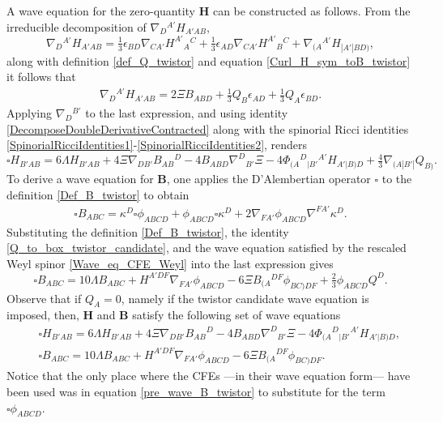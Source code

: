 \documentclass[10pt,a4paper]{article}
\theoremstyle{plain}
\def\bmB{{\bm B}}
\def\bmH{{\bm H}}
\begin{document}
A wave equation for the zero-quantity $\bmH$ can be constructed as
follows.  From the irreducible decomposition of
$\nabla_D{}^{A'}H_{A'AB}$,
\[
\nabla_{D}{}^{A'}H_{A'AB} = \tfrac{1}{3} \epsilon _{BD}
\nabla_{CA'}H^{A'}{}_{A}{}^{C} + \tfrac{1}{3} \epsilon _{AD}
\nabla_{CA'}H^{A'}{}_{B}{}^{C} + \nabla_{(A}{}^{A'}H_{|A'|BD)},
\]
 along with definition \eqref{def_Q_twistor} and equation
\eqref{Curl_H_sym_toB_twistor} it follows that
\begin{align}\label{derH_twistor_toBandQ}
\nabla_{D}{}^{A'}H_{A'AB} = 2 \Xi B_{ABD}  + \tfrac{1}{3} Q_{B}
\epsilon _{AD} + \tfrac{1}{3} Q_{A} \epsilon _{BD}.
\end{align}
Applying $\nabla_{D}{}^{B'}$ to the last expression, and using
identity \eqref{DecomposeDoubleDerivativeContracted} along with the
spinorial Ricci identities
\eqref{SpinorialRicciIdentities1}-\eqref{SpinorialRicciIdentities2},
renders
\begin{equation}\label{wave_H_twistor}
  \square H_{B'AB} = 6 \Lambda H_{B'AB} + 4 \Xi
  \nabla_{DB'}B_{AB}{}^{D} -4 B_{ABD} \nabla^{D}{}_{B'}\Xi -4
  \Phi_{(A}{}^{D}{}_{|B'}{}^{A'}H_{A'|B)D} + \tfrac{4}{3}
  \nabla_{(A|B'|}Q_{B)}.
\end{equation}
To derive a wave equation for $\bmB$, one applies the D'Alembertian operator
$\square$ to the definition \eqref{Def_B_twistor} to obtain
\begin{align}\label{pre_wave_B_twistor}
\square B_{ABC} = \kappa ^{D} \square \phi _{ABCD} + \phi _{ABCD}
\square \kappa ^{D} + 2 \nabla_{FA'}\phi _{ABCD} \nabla^{FA'}\kappa
^{D}.
\end{align}
Substituting the definition \eqref{Def_B_twistor}, the identity
\eqref{Q_to_box_twistor_candidate}, and the wave equation satisfied by
the rescaled Weyl spinor \eqref{Wave_eq_CFE_Weyl} into the last expression gives
\begin{equation}\label{wave_B_twistor}
\square B_{ABC} = 10 \Lambda B_{ABC}  + H^{A'DF} \nabla_{FA'}\phi _{ABCD}  -6 \Xi B_{(A}{}^{DF}\phi
_{BC)DF} + \tfrac{2}{3} \phi _{ABCD} Q^{D}.
\end{equation}
Observe that if $Q_{A}=0$, namely if the twistor candidate wave equation is imposed, then,
$\bmH$ and $\bmB$ satisfy the following set of wave equations
\begin{subequations}
\begin{eqnarray}
  && \square H_{B'AB} = 6 \Lambda H_{B'AB} + 4 \Xi
  \nabla_{DB'}B_{AB}{}^{D}  -4 B_{ABD} \nabla^{D}{}_{B'}\Xi   -4 \Phi_{(A}{}^{D}{}_{|B'}{}^{A'}H_{A'|B)D},
   \label{Hom_wave_HandB1} \\
 && \square B_{ABC} = 10\Lambda B_{ABC} + H^{A'DF} \nabla_{FA'}\phi _{ABCD}  -6 \Xi B_{(A}{}^{DF}\phi
_{BC)DF}.  \label{Hom_wave_HandB2}
\end{eqnarray}
\end{subequations}
Notice that the only place where the CFEs ---in their wave equation form---
have been used was in equation \eqref{pre_wave_B_twistor}
to substitute for the term $\square \phi _{ABCD}$.
\end{document}
